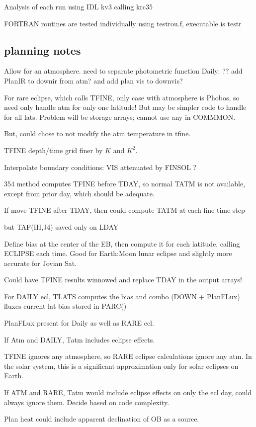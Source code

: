 \documentclass{article}
\begin{document}
Analysis of each run using IDL kv3 calling krc35

FORTRAN routines are tested individually using testrou.f, executable is testr

\subsection{planning notes}
Allow for an atmosphere.
\qi need to separate photometric function
\qi Daily:  ?? add PlanIR to downir from atm?
\qii   and add plan vis to downvis?

For rare eclipse, which calls TFINE, only case with atmosphere is Phobos, so
need only handle atm for only one latitude! But may be simpler code to handle
for all lats. Problem will be storage arrays; cannot use any in COMMMON.

But, could chose to not modify  the atm temperature in tfine.

TFINE depth/time grid finer by $K$ and $K^2$.

Interpolate boundary conditions: VIS attenuated by FINSOL ? 

 354 method computes TFINE before TDAY, so normal TATM is not available, except
 from prior day, which should be adequate.
 
If move TFINE after TDAY, then could compute TATM at each fine time step

but TAF(IH,J4) saved only on LDAY

Define bias at the center of the EB, then compute it for each latitude, calling
ECLIPSE each time. Good for Earth:Moon lunar eclipse and slightly more accurate
for Jovian Sat.

Could have TFINE results winnowed and replace TDAY in the output arrays!

For DAILY ecl, TLATS computes the bias and combo (DOWN + PlanFLux) fluxes 
 current lat bias stored in PARC()

PlanFLux present for Daily as well as RARE ecl.

If Atm and DAILY, Tatm includes eclipse effects.

TFINE ignores any atmosphere, so RARE eclipse calculations ignore any atm. In
the solar system, this is a significant approximation only for solar eclipses on
Earth.

If ATM and RARE, Tatm would include eclipse effects on only the ecl day, could always ignore them. Decide based on code complexity.

Plan heat could include apparent declination of OB as a source.
\end{document}
